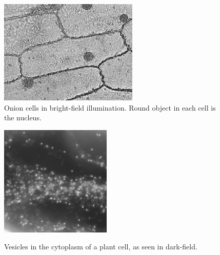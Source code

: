 \documentclass{../lab}
\begin{document}
\begin{figure}
\begin{minipage}[t]{.475\linewidth}
    \centering
    \href{http://experimentationlab.berkeley.edu/sites/default/files/images/250px-Image005.png}{\includegraphics[width=\linewidth,keepaspectratio]{images/250px-Image005.png}} \\
    \caption{Onion cells in bright-field illumination. Round object in each cell is the nucleus.}
\end{minipage}\hfill
\begin{minipage}[t]{.475\linewidth}
    \centering
    \href{http://experimentationlab.berkeley.edu/sites/default/files/images/Image003.png}{\includegraphics[width=\linewidth,keepaspectratio]{images/Image003.png}} \\
    \caption{Vesicles in the cytoplasm of a plant cell, as seen in dark-field.}
\end{minipage} 
\end{figure}
\end{document}
